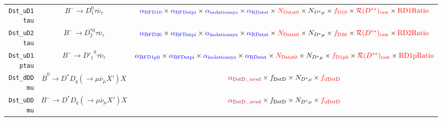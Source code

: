 \begin{landscape}
\begin{table}
\begin{tabular}{r|c|c}
  \texttt{Dst\_uD1tau} &                 $B^- \rightarrow D_1^0 \tau \overline{\nu}_\tau$                  &  $\textcolor{blue}{\alpha_\text{BFD10}} \times \textcolor{blue}{\alpha_\text{BFDstpi}} \times \textcolor{blue}{\alpha_\text{isolationsys}} \times \textcolor{blue}{\alpha_\text{RDstst}} \times \textcolor{red}{N_\text{Dstst0}} \times N_{D^* \mu} \times \textcolor{red}{f_\text{D10}} \times \textcolor{red}{\mathcal{R}(D^{**})_\text{raw}} \times \textcolor{red}{\text{RD1Ratio}}$   \\
  \texttt{Dst\_uD2tau} &                $B^- \rightarrow D_2^{*0} \tau \overline{\nu}_\tau$                &  $\textcolor{blue}{\alpha_\text{BFD20}} \times \textcolor{blue}{\alpha_\text{BFDstpi}} \times \textcolor{blue}{\alpha_\text{isolationsys}} \times \textcolor{blue}{\alpha_\text{RDstst}} \times \textcolor{red}{N_\text{Dstst0}} \times N_{D^* \mu} \times \textcolor{red}{f_\text{D20}} \times \textcolor{red}{\mathcal{R}(D^{**})_\text{raw}} \times \textcolor{red}{\text{RD2Ratio}}$   \\
 \texttt{Dst\_uD1ptau} &                $B^- \rightarrow {D'_1}^0 \tau \overline{\nu}_\tau$                & $\textcolor{blue}{\alpha_\text{BFD1p0}} \times \textcolor{blue}{\alpha_\text{BFDstpi}} \times \textcolor{blue}{\alpha_\text{isolationsys}} \times \textcolor{blue}{\alpha_\text{RDstst}} \times \textcolor{red}{N_\text{Dstst0}} \times N_{D^* \mu} \times \textcolor{red}{f_\text{D1p0}} \times \textcolor{red}{\mathcal{R}(D^{**})_\text{raw}} \times \textcolor{red}{\text{RD1pRatio}}$ \\
   \texttt{Dst\_dDDmu} &  $\overline{B}^0 \rightarrow D^* D_q (\rightarrow \mu \overline{\nu}_\mu X') X$   &                                                                                                                               $\textcolor{purple}{\alpha_\text{DstD\_uvsd}} \times f_\text{DstD} \times N_{D^* \mu} \times \textcolor{red}{f_\text{dDstD}}$                                                                                                                                \\
   \texttt{Dst\_uDDmu} &        $B^- \rightarrow D^* D_q (\rightarrow \mu \overline{\nu}_\mu X') X$        &                                                                                                                               $\textcolor{purple}{\alpha_\text{DstD\_uvsd}} \times f_\text{DstD} \times N_{D^* \mu} \times \textcolor{red}{f_\text{uDstD}}$                                                                                                                                \\

\end{tabular}
\end{table}
\end{landscape}
